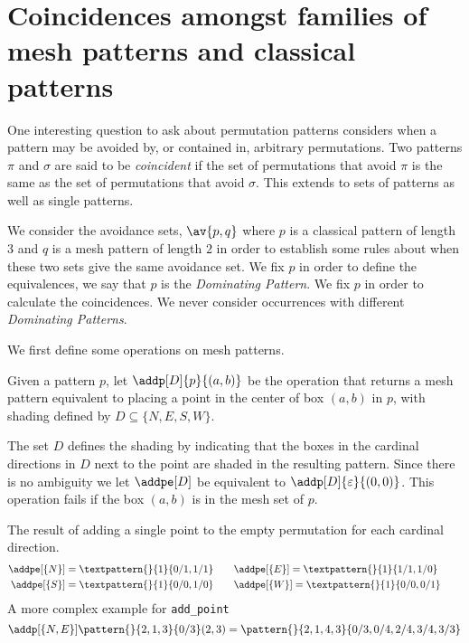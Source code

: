 \chapter{Coincidences amongst families of mesh patterns and classical patterns}\label{chap:coincs}
One interesting question to ask about permutation patterns considers when a
pattern may be avoided by, or contained in, arbitrary permutations. Two
patterns \(\pi\) and \(\sigma\) are said to be \emph{coincident} if the set
of permutations that avoid \(\pi\) is the same as the set of permutations that
avoid \(\sigma\). This extends to sets of patterns as well as single patterns.

We consider the avoidance sets, \(\av{p,q}\) where \(p\) is a classical pattern
of length \(3\) and \(q\) is a mesh pattern of length \(2\) in order to
establish some rules about when these two sets give the same avoidance set.
We fix \(p\) in order to define the equivalences, we say that \(p\) is the
\emph{Dominating Pattern}. We fix \(p\) in order to calculate the coincidences.
We never consider occurrences with different \emph{Dominating Patterns}.

We first define some operations on mesh patterns.
\begin{definition}
Given a pattern \(p\), let \(\addp[D]{p}{(a,b)}\) be the operation that returns
a mesh pattern equivalent to placing a point in the center of box \((a,b)\) in
\(p\), with shading defined by \(D\subseteq\{N,E,S,W\}\).
\end{definition}
The set \(D\) defines the shading by indicating that the boxes in the cardinal
directions in \(D\) next to the point are shaded in the resulting pattern.
Since there is no ambiguity we let \(\addpe[D]\) be equivalent to \(\addp[D]{\varepsilon}{(0,0)}\).
This operation fails if the box \((a,b)\) is in the mesh set of \(p\).

\begin{example}
    The result of adding a single point to the empty permutation for each cardinal direction.
 \begin{align*}
     \addpe[\{N\}] = \textpattern{}{1}{0/1,1/1} &\qquad\addpe[\{E\}] =\textpattern{}{1}{1/1,1/0} \qquad \\
     \addpe[\{S\}] = \textpattern{}{1}{0/0,1/0} &\qquad\addpe[\{W\}] =\textpattern{}{1}{0/0,0/1} \qquad
\end{align*}
    A more complex example for \texttt{add\_point}
\begin{equation*}
\addp[\{N,E\}]{\pattern{}{2,1,3}{0/3}}{(2,3)} = \pattern{}{2,1,4,3}{0/3,0/4,2/4,3/4,3/3}
\end{equation*}
\end{example}

